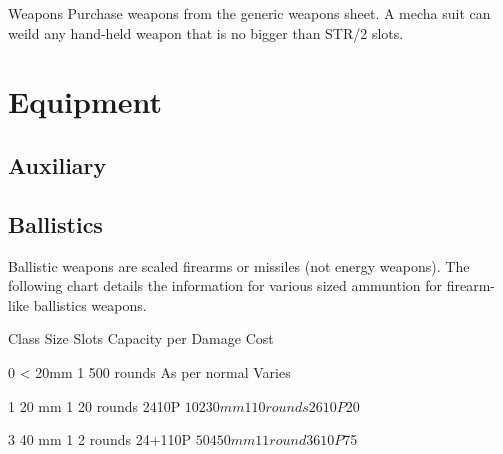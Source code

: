 \documentclass[twoside]{book}
\begin{document}
                
                Weapons  
                    Purchase weapons from the generic weapons
                   sheet. 
                   A mecha suit can weild any hand-held weapon that
                   is no bigger than STR/2 slots. 
                
            
\section{Equipment}
    
\subsection{Auxiliary}
    
\subsection{Ballistics}
      Ballistic weapons are scaled firearms or missiles
               (not energy weapons). The following chart details the
               information for various sized ammuntion for firearm-like
               ballistics weapons.   
                
                  
                   Class   
                   Size   
                   Slots   
                   Capacity per   
                   Damage   
                   Cost   
                  
                  
                   0   
                   < 20mm   
                   1   
                   500 rounds   
                   As per normal   
                   Varies   
                  
                  
                   1   
                   20 mm   
                   1   
                   20 rounds   
                   2410P   
                   $10   
                  
                  
                   2   
                   30 mm   
                   1   
                   10 rounds   
                   2610P   
                   $20   
                  
                  
                   3   
                   40 mm   
                   1   
                   2 rounds   
                   24+110P   
                   $50   
                  
                  
                   4   
                   50 mm   
                   1   
                   1 round   
                   3610P   
                   $75   
                  
\end{document}
